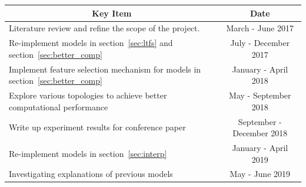 \documentclass{article} \usepackage{tabularx}
\begin{document}
	\begin{table}[H]
		\centering
		\label{tab:work_plan}
		\def\arraystretch{1.5}%
		\begin{tabularx}{\textwidth}{|X|l|}
			\hline
			\multicolumn{1}{|c|}{\textbf{Key Item}}                                                        & \multicolumn{1}{c|}{\textbf{Date}} \\ \hline
			Literature review and refine the scope of the project.
                                                                                                     &
                                                                                                       \multicolumn{1}{c|}{March
                                                                                                       -
                                                                                                       June
                                                                                                       2017}
      \\ \hline
			Re-implement models in section~\ref{sec:ltfs} and section~\ref{sec:better_comp} &
                                                                                        \multicolumn{1}{c|}{July
                                                                                        -
                                                                                        December
                                                                                        2017}            \\ \hline
			Implement feature selection mechanism for models in
      section~\ref{sec:better_comp} & \multicolumn{1}{c|}{January
                                      - April 2018}          \\ \hline
			Explore various topologies to achieve better computational
      performance & \multicolumn{1}{c|}{May - September 2018}             \\ \hline
			Write up experiment results for conference paper & \multicolumn{1}{c|}{September - December 2018}       \\ \hline
			Re-implement models in section~\ref{sec:interp} &
                                                        \multicolumn{1}{c|}{January
                                                        - April 2019}            \\ \hline
      Investigating explanations of previous models &
                                                      \multicolumn{1}{c|}{May - June 2019}                \\ \hline

\end{tabularx}
\end{table}
\end{document}
